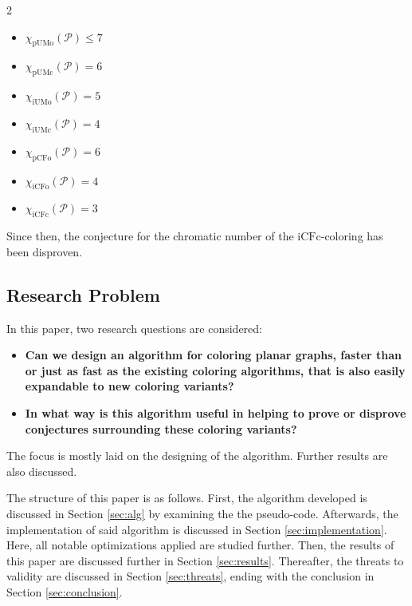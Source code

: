 \documentclass{article}
\begin{document}
\begin{minipage}{0.45\textwidth}
	\raggedcolumns
	\begin{multicols}{2}
		\begin{itemize}
			\item $\chi_{\mathrm{pUMo}}(\mathcal{P}) \leq 7$
			\item $\chi_{\mathrm{pUMc}}(\mathcal{P}) = 6$
			\item $\chi_{\mathrm{iUMo}}(\mathcal{P}) = 5$
			\item $\chi_{\mathrm{iUMc}}(\mathcal{P}) = 4$
			\item $\chi_{\mathrm{pCFo}}(\mathcal{P}) = 6$
			\item $\chi_{\mathrm{iCFo}}(\mathcal{P}) = 4$
			\item $\chi_{\mathrm{iCFc}}(\mathcal{P}) = 3$
		\end{itemize}
	\end{multicols}
\end{minipage}
\vspace{0.4cm}

Since then, the conjecture for the chromatic number of the $\mathrm{iCFc}$-coloring has been disproven.


\subsection{Research Problem}

In this paper, two research questions are considered:

\begin{itemize}
	\item \textbf{Can we design an algorithm for coloring planar graphs, faster than or just as fast as the existing coloring algorithms, that is also easily expandable to new coloring variants?}
	\item \textbf{In what way is this algorithm useful in helping to prove or disprove conjectures surrounding these coloring variants?}
\end{itemize}

The focus is mostly laid on the designing of the algorithm. Further results are also discussed.

The structure of this paper is as follows. First, the algorithm developed is discussed in Section \ref{sec:alg} by examining the the pseudo-code. Afterwards, the implementation of said algorithm is discussed in Section \ref{sec:implementation}. Here, all notable optimizations applied are studied further. Then, the results of this paper are discussed further in Section \ref{sec:results}. Thereafter, the threats to validity are discussed in Section \ref{sec:threats}, ending with the conclusion in Section \ref{sec:conclusion}.
\end{document}
